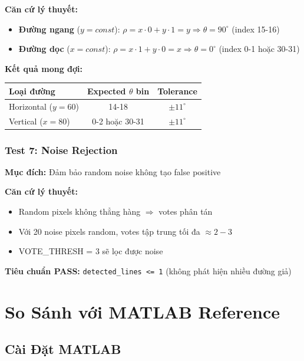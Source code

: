 \documentclass[12pt,a4paper]{article}
\begin{document}
\textbf{Căn cứ lý thuyết:}
\begin{itemize}
    \item \textbf{Đường ngang} ($y = const$): $\rho = x \cdot 0 + y \cdot 1 = y \Rightarrow \theta = 90^\circ$ (index 15-16)
    \item \textbf{Đường dọc} ($x = const$): $\rho = x \cdot 1 + y \cdot 0 = x \Rightarrow \theta = 0^\circ$ (index 0-1 hoặc 30-31)
\end{itemize}

\textbf{Kết quả mong đợi:}
\begin{table}[H]
\centering
\begin{tabular}{|l|c|c|}
\hline
\textbf{Loại đường} & \textbf{Expected $\theta$ bin} & \textbf{Tolerance} \\
\hline
Horizontal ($y = 60$) & 14-18 & $\pm 11^\circ$ \\
\hline
Vertical ($x = 80$) & 0-2 hoặc 30-31 & $\pm 11^\circ$ \\
\hline
\end{tabular}
\end{table}

\subsubsection{Test 7: Noise Rejection}

\textbf{Mục đích:} Đảm bảo random noise không tạo false positive

\textbf{Căn cứ lý thuyết:}
\begin{itemize}
    \item Random pixels không thẳng hàng $\Rightarrow$ votes phân tán
    \item Với 20 noise pixels random, votes tập trung tối đa $\approx 2-3$
    \item VOTE\_THRESH = 3 sẽ lọc được noise
\end{itemize}

\textbf{Tiêu chuẩn PASS:} \texttt{detected\_lines <= 1} (không phát hiện nhiều đường giả)

\section{So Sánh với MATLAB Reference}

\subsection{Cài Đặt MATLAB}
\end{document}
